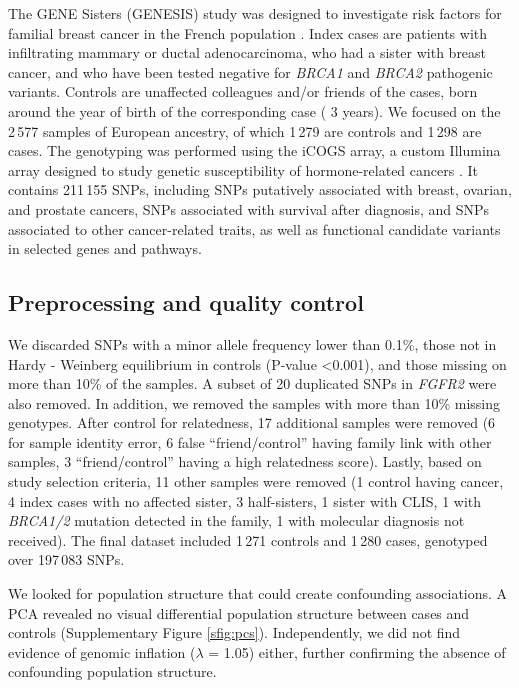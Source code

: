 \documentclass[twocolumn, 10pt]{article}
\begin{document}
The GENE Sisters (GENESIS) study was designed to investigate risk factors for familial breast cancer in the French population \cite{sinilnikova_genesis:_2016}. Index cases are patients with infiltrating mammary or ductal adenocarcinoma, who had a sister with breast cancer, and who have been tested negative for \emph{BRCA1} and \emph{BRCA2} pathogenic variants. Controls are unaffected colleagues and/or friends of the cases, born around the year of birth of the corresponding case (\textpm{} 3 years). We focused on the 2\,577 samples of European ancestry, of which 1\,279 are controls and 1\,298 are cases. The genotyping was performed using the iCOGS array, a custom Illumina array designed to study genetic susceptibility of hormone-related cancers \cite{sakoda_turning_2013}. It contains 211\,155 SNPs, including SNPs putatively associated with breast, ovarian, and prostate cancers, SNPs associated with survival after diagnosis, and SNPs associated to other cancer-related traits, as well as functional candidate variants in selected genes and pathways.

\subsection{Preprocessing and quality control}

We discarded SNPs with a minor allele frequency lower than 0.1\%, those not in Hardy - Weinberg equilibrium in controls (P-value \textless 0.001), and those missing on more than 10\% of the samples. A subset of 20 duplicated SNPs in \emph{FGFR2} were also removed. In addition, we removed the samples with more than 10\% missing genotypes. After control for relatedness, 17 additional samples were removed (6 for sample identity error, 6 false ``friend/control'' having family link with other samples, 3 ``friend/control'' having a high relatedness score). Lastly, based on study selection criteria, 11 other samples were removed (1 control having cancer, 4 index cases with no affected sister, 3 half-sisters, 1 sister with CLIS, 1 with \emph{BRCA1/2} mutation detected in the family, 1 with molecular diagnosis not received). The final dataset included 1\,271 controls and 1\,280 cases, genotyped over 197\,083 SNPs. 

We looked for population structure that could create confounding associations. A PCA revealed no visual differential population structure between cases and controls (Supplementary Figure \ref{sfig:pcs}). Independently, we did not find evidence of genomic inflation (\(\lambda\) = 1.05) either, further confirming the absence of confounding population structure.
\end{document}
